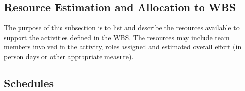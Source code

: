 \documentclass{l3deliverable}
\begin{document}
{%

\subsection{Resource Estimation and Allocation to WBS\label{sec:allocation}}



The purpose of this subsection is to list and describe the resources
available to support the activities defined in the WBS. The resources
may include team members involved in the activity, roles assigned and
estimated overall effort (in person days or other appropriate
measure).


\subsection{Schedules}

}
\end{document}
